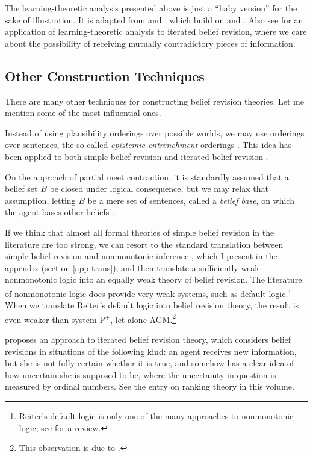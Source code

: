 The learning-theoretic analysis presented above is just a ``baby version'' for the sake of illustration. It is adapted from \citet{genin2015theory} and \citet*{kelly2016realism}, which build on \citet{schulte1999means} and \citet{kelly2007simplicity}. Also see \citet{kelly1999iterated} for an application of learning-theoretic analysis to iterated belief revision, where we care about the possibility of receiving mutually contradictory pieces of information.


\subsection{Other Construction Techniques}\label{sec-other}

There are many other techniques for constructing belief revision theories. Let me mention some of the most influential ones.\op

	\im Instead of using plausibility orderings over possible worlds, we may use orderings over sentences, the so-called {\em epistemic entrenchment} orderings \citep{gardenfors1988revisions}. This idea has been applied to both simple belief revision and iterated belief revision \citep{nayak1994iterated}. 

	\im On the approach of partial meet contraction, it is standardly assumed that a belief set $B$ be closed under logical consequence, but we may relax that assumption, letting $B$ be a mere set of sentences, called a {\em belief base}, on which the agent bases other beliefs \citep{hansson1994taking,hansson1999textbook}. 

	\im If we think that almost all formal theories of simple belief revision in the literature are too strong, we can resort to the standard translation between simple belief revision and nonmonotonic inference \citep*{makinson1991relations}, which I present in the appendix (section \ref{app-trans}), and then translate a sufficiently weak nonmonotonic logic into an equally weak theory of belief revision. The literature of nonmonotonic logic does provide very weak systems, such as  default logic.\footnote
		{
		Reiter's default logic is only one of the many approaches to nonmonotonic logic; see \citet*{brewka2008nonmonotonic} for a review.
		}
	When we translate Reiter's default logic into belief revision theory, the result is even weaker than system P$^+$, let alone AGM.\footnote
		{
		This observation is due to \citet{makinson1988general}.
		}

	\im \citet{spohn1988ordinal} proposes an approach to iterated belief revision theory, which considers belief revisions in situations of the following kind: an agent receives new information, but she is not fully certain whether it is true, and somehow has a clear idea of how uncertain she is supposed to be, where the uncertainty in question is measured by ordinal numbers. See the entry on ranking theory in this volume.

